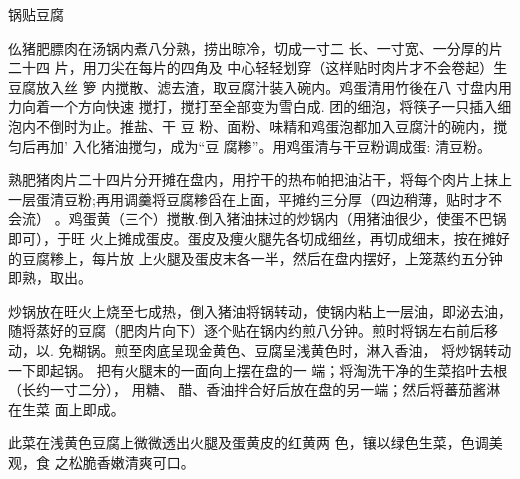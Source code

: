 \begin{recipe}{锅贴豆腐}

\ingredients


\cooking

仫猪肥膘肉在汤锅内煮八分熟，捞出晾冷，切成一寸二 长、一寸宽、一分厚的片二十四
片，用刀尖在每片的四角及 中心轻轻划穿（这样贴时肉片才不会卷起）生豆腐放入丝 箩
内搅散、滤去渣，取豆腐汁装入碗内。鸡蛋清用竹後在八 寸盘内用力向着一个方向快速
搅打，搅打至全部变为雪白成. 团的细泡，将筷子一只插入细泡内不倒时为止。推盐、干
豆 粉、面粉、味精和鸡蛋泡都加入豆腐汁的碗内，搅匀后再加' 入化猪油搅匀，成为“豆
腐糁”。用鸡蛋清与干豆粉调成蛋: 清豆粉。

\step 熟肥猪肉片二十四片分开摊在盘内，用拧干的热布帕把油沾干，将每个肉片上抹上
一层蛋清豆粉;再用调羹将豆腐糁舀在上面，平摊约三分厚（四边稍薄，贴时才不会流）
。鸡蛋黄（三个）搅散.倒入猪油抹过的炒锅内（用猪油很少，使蛋不巴锅即可），于旺
火上摊成蛋皮。蛋皮及痩火腿先各切成细丝，再切成细末，按在摊好的豆腐糁上，每片放
上火腿及蛋皮末各一半，然后在盘内摆好，上笼蒸约五分钟即熟，取出。

\step 炒锅放在旺火上烧至七成热，倒入猪油将锅转动，使锅内粘上一层油，即泌去油，
随将蒸好的豆腐（肥肉片向下）逐个贴在锅内约煎八分钟。煎时将锅左右前后移动，以.
免糊锅。煎至肉底呈现金黄色、豆腐呈浅黄色时，淋入香油， 将炒锅转动一下即起锅。
把有火腿末的一面向上摆在盘的一 端；将淘洗干净的生菜掐叶去根（长约一寸二分），
用糖、 醋、香油拌合好后放在盘的另一端；然后将蕃茄酱淋在生菜 面上即成。

\notes

此菜在浅黄色豆腐上微微透出火腿及蛋黄皮的红黄两 色，镶以绿色生菜，色调美观，食
之松脆香嫩清爽可口。

\end{recipe}

